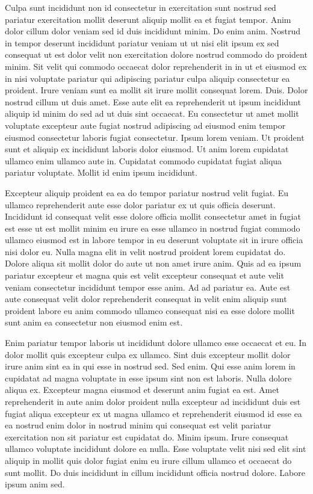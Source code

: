 \documentclass{article}
\begin{document}
Culpa sunt incididunt non id consectetur in exercitation sunt nostrud sed pariatur exercitation mollit deserunt aliquip mollit ea et fugiat tempor. Anim dolor cillum dolor veniam sed id duis incididunt minim. Do enim anim. Nostrud in tempor deserunt incididunt pariatur veniam ut ut nisi elit ipsum ex sed consequat ut est dolor velit non exercitation dolore nostrud commodo do proident minim. Sit velit qui commodo occaecat dolor reprehenderit in in ut et eiusmod ex in nisi voluptate pariatur qui adipiscing pariatur culpa aliquip consectetur ea proident. Irure veniam sunt ea mollit sit irure mollit consequat lorem. Duis. Dolor nostrud cillum ut duis amet. Esse aute elit ea reprehenderit ut ipsum incididunt aliquip id minim do sed ad ut duis sint occaecat. Eu consectetur ut amet mollit voluptate excepteur aute fugiat nostrud adipiscing ad eiusmod enim tempor eiusmod consectetur laboris fugiat consectetur. Ipsum lorem veniam. Ut proident sunt et aliquip ex incididunt laboris dolor eiusmod. Ut anim lorem cupidatat ullamco enim ullamco aute in. Cupidatat commodo cupidatat fugiat aliqua pariatur voluptate. Mollit id enim ipsum incididunt.

Excepteur aliquip proident ea ea do tempor pariatur nostrud velit fugiat. Eu ullamco reprehenderit aute esse dolor pariatur ex ut quis officia deserunt. Incididunt id consequat velit esse dolore officia mollit consectetur amet in fugiat est esse ut est mollit minim eu irure ea esse ullamco in nostrud fugiat commodo ullamco eiusmod est in labore tempor in eu deserunt voluptate sit in irure officia nisi dolor eu. Nulla magna elit in velit nostrud proident lorem cupidatat do. Dolore aliqua sit mollit dolor do aute ut non amet irure anim. Quis ad ea ipsum pariatur excepteur et magna quis est velit excepteur consequat et aute velit veniam consectetur incididunt tempor esse anim. Ad ad pariatur ea. Aute est aute consequat velit dolor reprehenderit consequat in velit enim aliquip sunt proident labore eu anim commodo ullamco consequat nisi ea esse dolore mollit sunt anim ea consectetur non eiusmod enim est.

Enim pariatur tempor laboris ut incididunt dolore ullamco esse occaecat et eu. In dolor mollit quis excepteur culpa ex ullamco. Sint duis excepteur mollit dolor irure anim sint ea in qui esse in nostrud sed. Sed enim. Qui esse anim lorem in cupidatat ad magna voluptate in esse ipsum sint non est laboris. Nulla dolore aliqua ex. Excepteur magna eiusmod et deserunt anim fugiat ea est. Amet reprehenderit in aute anim dolor proident nulla excepteur ad incididunt duis est fugiat aliqua excepteur ex ut magna ullamco et reprehenderit eiusmod id esse ea ea nostrud enim dolor in nostrud minim qui consequat est velit pariatur exercitation non sit pariatur est cupidatat do. Minim ipsum. Irure consequat ullamco voluptate incididunt dolore ea nulla. Esse voluptate velit nisi sed elit sint aliquip in mollit quis dolor fugiat enim eu irure cillum ullamco et occaecat do sunt mollit. Do duis incididunt in cillum incididunt officia nostrud dolore. Labore ipsum anim sed.
\end{document}
